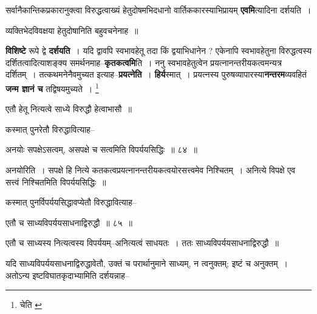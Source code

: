 \documentclass[article,12pt,a4paper]{memoir}
\begin{document}
	  \endgroup
	

	  \pstart सर्वानैकान्तिकप्रकारानुक्त्वा विरुद्धत्वाख्यं हेतुदोषमभिदधानो वार्तिककारस्याभिप्रायम् \textbf{एवमि}त्यादिना दर्शयति ।
	\pend
      

	  \pstart व्यक्तिभेदविवक्षया हेतुदोषानिति बहुवचनेनाह ॥
	\pend
      

	  \pstart \textbf{विशिष्टे} रूपे द्वे \textbf{दर्शयति} । यदि द्वावपि स्वभावहेतू तदा किं द्वयाभिधानेन ? एकेनापि स्वभावहेतुना विरुद्धत्वस्य दर्शितत्वादित्याशङ्क्य समर्थनमाह--\textbf{कृतकत्वमि}ति । ननु स्वभावहेतुत्वेन प्रयत्नानन्तरीयकत्वमन्यत्र दर्शितम् । तत्कथमनेनैवमुच्यत इत्याह--\textbf{प्रयत्नेति} । \textbf{हिर्य}स्मात् । प्रयत्नस्य पुरुषव्यापारस्या\textbf{नन्तरम}व्यवहितं \textbf{जन्म ज्ञानं च} तद्विषयमुच्यते ।
	\pend
      \footnote{चेति \cite{dp-msC}}
	  \bigskip
	  \begingroup
	

	  \pstart एतौ हेतू नित्यत्वे साध्ये विरुद्धौ हेत्वाभासौ ॥
	\pend
        

	  \pstart कस्मात् पुनरेतौ विरुद्धावित्याह--
	\pend
        
	  \bigskip
	  \begingroup
	

	  \pstart अनयोः सपक्षेऽसत्वम्, असपक्षे च सत्वमिति विपर्ययसिद्धिः ॥ ८४ ॥
	\pend
      
	  \endgroup
	 

	  \pstart अनयोरिति । सपक्षे हि नित्ये कतकत्वप्रयत्नानन्तरीयकत्वयोरसत्त्वमेव निश्चितम् । अनित्ये विपक्षे एव सत्त्वं निश्चितमिति विपर्ययसिद्धिः ॥
	\pend
        

	  \pstart कस्मात् पुनर्विपर्ययसिद्धावप्येतौ विरुद्धावित्याह--
	\pend
        
	  \bigskip
	  \begingroup
	

	  \pstart एतौ च साध्यविपर्ययसाधनाद्विरुद्धौ ॥ ८५ ॥
	\pend
      
	  \endgroup
	 

	  \pstart एतौ च साध्यस्य नित्यत्वस्य विपर्ययम्--अनित्यत्वं साधयतः । ततः साध्यविपर्ययसाधनाद्विरुद्धौ ॥
	\pend
        

	  \pstart यदि साध्यविपर्ययसाधनाद्विरुद्धावेतौ, उक्तं च परार्थानुमाने साध्यम्, न त्वनुक्तम्; इष्टं च अनुक्तम् । अतोऽन्य इष्टविघातकृदाभ्यामिति दर्शयन्नाह--
	\pend
        
\end{document}
